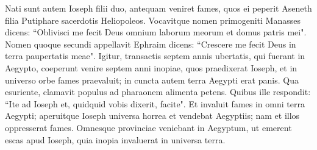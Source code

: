 \begin{biblechapter}
\verse Nati sunt autem Ioseph filii duo, antequam veniret fames, quos ei peperit Aseneth filia Putiphare sacerdotis Heliopoleos. 
\verse Vocavitque nomen primogeniti Manasses dicens: “Oblivisci me fecit Deus omnium laborum meorum et domus patris mei". 
\verse Nomen quoque secundi appellavit Ephraim dicens: “Crescere me fecit Deus in terra paupertatis meae". 
\verse Igitur, transactis septem annis ubertatis, qui fuerant in Aegypto, 
\verse coeperunt venire septem anni inopiae, quos praedixerat Ioseph, et in universo orbe fames praevaluit; in cuncta autem terra Aegypti erat panis. 
\verse Qua esuriente, clamavit populus ad pharaonem alimenta petens. Quibus ille respondit: “Ite ad Ioseph et, quidquid vobis dixerit, facite". 
\verse Et invaluit fames in omni terra Aegypti; aperuitque Ioseph universa horrea et vendebat Aegyptiis; nam et illos oppresserat fames. 
\verse Omnesque provinciae veniebant in Aegyptum, ut emerent escas apud Ioseph, quia inopia invaluerat in universa terra. 
\end{biblechapter}

